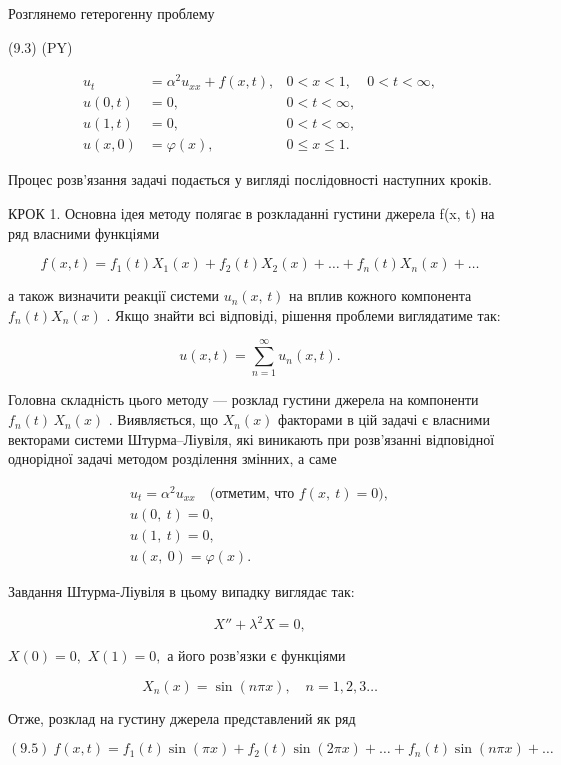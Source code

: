 \documentclass[
  ukrainian,
]{article}
\begin{document}
Розглянемо гетерогенну проблему

(9.3) (PY)

\[
\begin{aligned} u_t &= \alpha^2 u_{xx} + f(x, t), & 0 < x < 1, & 0 < t < \infty, \\ u(0, t) &= 0, & 0 < t < \infty, \\ u(1, t) &= 0, & 0 < t < \infty, \\ u(x, 0) &= \varphi(x), & 0 \leqslant x \leqslant 1. \end{aligned}
\]

Процес розв'язання задачі подається у вигляді послідовності наступних
кроків.

КРОК 1. Основна ідея методу полягає в розкладанні густини джерела f(x,
t) на ряд власними функціями

\[
f(x, t) = f_1(t) X_1(x) + f_2(t) X_2(x) + \dots + f_n(t) X_n(x) + \dots
\]

а також визначити реакції системи \(u_n\left(x,\,t\right)\) на вплив
кожного компонента \(f_n\left(t\right)X_n\left(x\right)\) . Якщо знайти
всі відповіді, рішення проблеми виглядатиме так:

\[
u(x, t) = \sum_{n=1}^{\infty} u_n(x, t).
\]

Головна складність цього методу --- розклад густини джерела на
компоненти \(f_n(t)\,X_n(x)\) . Виявляється, що \(X_n(x)\) факторами в
цій задачі є власними векторами системи Штурма--Ліувіля, які виникають
при розв'язанні відповідної однорідної задачі методом розділення
змінних, а саме

\[
\begin{aligned} u_t = \alpha^2 u_{xx} \quad \text{(отметим, что } f(x, \ t) = 0), \\ u(0, \ t) = 0, \\ u(1, \ t) = 0, \\ u(x, \ 0) = \varphi(x). \end{aligned}
\]

Завдання Штурма-Ліувіля в цьому випадку виглядає так:

\[
X'' + \lambda^2 X = 0,
\]

\(X(0) = 0,\) \(X(1) = 0,\) а його розв'язки є функціями

\[
X_n(x) = \sin(n\pi x), \quad n = 1, 2, 3 \dots
\]

Отже, розклад на густину джерела представлений як ряд

\[
(9.5) \ f(x,t) = f_1(t) \sin(\pi x) + f_2(t) \sin(2\pi x) + \dots + f_n(t) \sin(n\pi x) + \dots
\]
\end{document}
